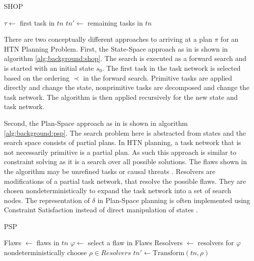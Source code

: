 \begin{algorithm}
  \caption{SHOP}
  \label{alg:background:shop}
  \KwOut{$\pi$}
  $\tau \leftarrow$ first task in $tn$\;
  $tn' \leftarrow$ remaining tasks in $tn$\;
\end{algorithm}

There are two conceptually different approaches to arriving at a plan $\pi$ for an HTN Planning Problem. 
First, the State-Space approach as in \cite{nauSHOPSimpleHierarchical1999} is shown in algorithm \ref{alg:background:shop}.
The search is executed as a forward search and is started with an initial state $s_0$.
The first task in the task network is selected based on the ordering $\prec$ in the forward search.
Primitive tasks are applied directly and change the state, nonprimitive tasks are decomposed and change the task network.
The algorithm is then applied recursively for the new state and task network.

Second, the Plan-Space approach as in \citet[chap.~5]{ghallabAutomatedPlanningTheory2004} is shown in algorithm \ref{alg:background:psp}.
The search problem here is abstracted from states and the search space consists of partial plans.
In HTN planning, a task network that is not necessarily primitive is a partial plan.
As such this approach is similar to constraint solving as it is a search over all possible solutions.
The flaws shown in the algorithm may be unrefined tasks or causal threats .
Resolvers are modifications of a partial task network, that resolve the possible flaws.
They are chosen nondeterministically to expand the task network into a set of search nodes.
The representation of $\delta$ in Plan-Space planning is often implemented using Constraint Satisfaction instead of direct manipulation of states \citep{georgievskiHTNPlanningOverview2015}.

\begin{algorithm}
  \caption{PSP}
  \label{alg:background:psp}
  \KwOut{$\pi$}
  Flaws $\leftarrow$ flaws in $tn$\;
  $\varphi \leftarrow$ select a flaw in Flaws\;
  Resolvers $\leftarrow$ resolvers for $\varphi$\;
  nondeterministically choose $\rho \in Resolvers$\;
  $tn' \leftarrow \text{Transform}(tn, \rho)$\;
\end{algorithm}




